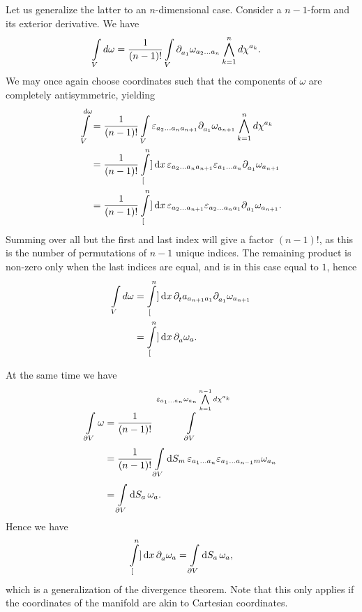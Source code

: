 Let us generalize the latter to an $n$-dimensional case. Consider a $n - 1$-form and its exterior derivative. We have
\begin{align*}
	\int\limits_{V}^{}{d\omega} &= \frac{1}{(n - 1)!}\int\limits_{V}^{}{\partial^{}_{a_{1}}{\omega_{a_{2}\dots a_{n}}}\bigwedge\limits_{k = 1}^{n}d\chi^{a_{k}}}.
\end{align*}
We may once again choose coordinates such that the components of $\omega$ are completely antisymmetric, yielding
\begin{align*}
	\int\limits_{V}^{d\omega} &= \frac{1}{(n - 1)!}\int\limits_{V}^{}{\varepsilon_{a_{2}\dots a_{n}a_{n + 1}}\partial^{}_{a_{1}}{\omega_{a_{n + 1}}}\bigwedge\limits_{k = 1}^{n}d\chi^{a_{k}}} \\
	                      &= \frac{1}{(n - 1)!}\int\limits_{[}^{n}]{}{}\dd{x}{\varepsilon_{a_{2}\dots a_{n}a_{n + 1}}\varepsilon_{a_{1}\dots a_{n}}\ensuremath{\partial^{}_{a_{1}}}{\omega_{a_{n + 1}}}} \\
	                      &= \frac{1}{(n - 1)!}\int\limits_{[}^{n}]{}{}\dd{x}{\varepsilon_{a_{2}\dots a_{n + 1}}\varepsilon_{a_{2}\dots a_{n}a_{1}}\ensuremath{\partial^{}_{a_{1}}}{\omega_{a_{n + 1}}}}.
\end{align*}
Summing over all but the first and last index will give a factor $(n - 1)!$, as this is the number of permutations of $n - 1$ unique indices. The remaining product is non-zero only when the last indices are equal, and is in this case equal to $1$, hence
\begin{align*}
	\int\limits_{V}^{}{d\omega} &= \int\limits_{[}^{n}]{}{}\dd{x}{\ensuremath{\partial^{}_{t}}a_{a_{n + 1}a_{1}}\ensuremath{\partial^{}_{a_{1}}}{\omega_{a_{n + 1}}}} \\
	                        &= \int\limits_{[}^{n}]{}{}\dd{x}{\ensuremath{\partial^{}_{a}}{\omega_{a}}}.
\end{align*}

At the same time we have
\begin{align*}
	\int\limits_{\partial V}^{}{\omega} &= \frac{1}{(n - 1)!}\int\limits_{\partial V}^{\varepsilon_{a_{1}\dots a_{n}}\omega_{a_{n}}\bigwedge\limits_{k = 1}^{n - 1}d\chi^{a_{k}}} \\
	                           &= \frac{1}{(n - 1)!}\int\limits_{\partial V}^{}\dd{S_{m}}{\varepsilon_{a_{1}\dots a_{n}}\varepsilon_{a_{1}\dots a_{n - 1}m}\omega_{a_{n}}} \\
	                           &= \int\limits_{\partial V}^{}\dd{S_{a}}{\omega_{a}}.
\end{align*}
Hence we have
\begin{align*}
	\int\limits_{[}^{n}]{}{}\dd{x}{\ensuremath{\partial^{}_{a}}{\omega_{a}}} = \int\limits_{\partial V}^{}\dd{S_{a}}{\omega_{a}},
\end{align*}
which is a generalization of the divergence theorem. Note that this only applies if the coordinates of the manifold are akin to Cartesian coordinates.